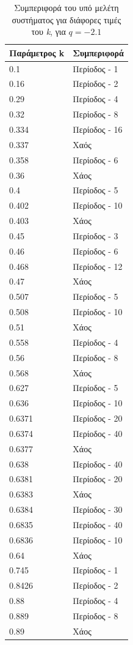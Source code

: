 \begin{table}[ht]
	\centering
	\caption{ Συμπεριφορά του υπό μελέτη συστήματος για διάφορες τιμές του \emph{k}, για  $q=-2.1$ }
	\label{tab:abc9}
	\begin{tabular}{l | l}
		Παράμετρος k & Συμπεριφορά \\
		\hline
		0.1 &  Περίοδος -  1 \\
		0.16 &  Περίοδος -  2 \\
		0.29& Περίοδος -  4 \\
		0.32& Περίοδος -  8 \\
		0.334 &  Περίοδος -  16 \\
		0.337& Χαός \\
		0.358& Περίοδος -  6 \\
		0.36& Χάος \\
		0.4 &  Περίοδος -  5 \\
		0.402 &  Περίοδος -  10 \\
		0.403 &  Χάος \\
		0.45 &  Περίοδος -  3\\
		0.46 & Περίοδος -  6\\
		0.468 & Περίοδος -  12\\
		0.47 &Χάος\\
		0.507& Περίοδος -  5\\
		0.508 & Περίοδος -  10\\
		0.51 & Χάος\\
		0.558 & Περίοδος -  4\\
		0.56 & Περίοδος -  8\\
		0.568 & Χάος\\
		0.627 & Περίοδος -  5\\
		0.636 & Περίοδος -  10\\
		0.6371 & Περίοδος -  20\\
		0.6374& Περίοδος -  40\\
		0.6377 & Χάος\\
		0.638 &  Περίοδος -  40\\
		0.6381 &  Περίοδος -  20 \\
		0.6383 & Χάος\\
		0.6384 & Περίοδος -  30\\
		0.6835 & Περίοδος -  40\\
		0.6836 & Περίοδος -  10\\
		0.64 & Χάος\\
		0.745& Περίοδος -  1 \\
		0.8426& Περίοδος -  2 \\
		0.88 &  Περίοδος -  4 \\
		0.889& Περίοδος -  8\\
		0.89 &Χάος\\
		
		
	\end{tabular}
	
\end{table}

